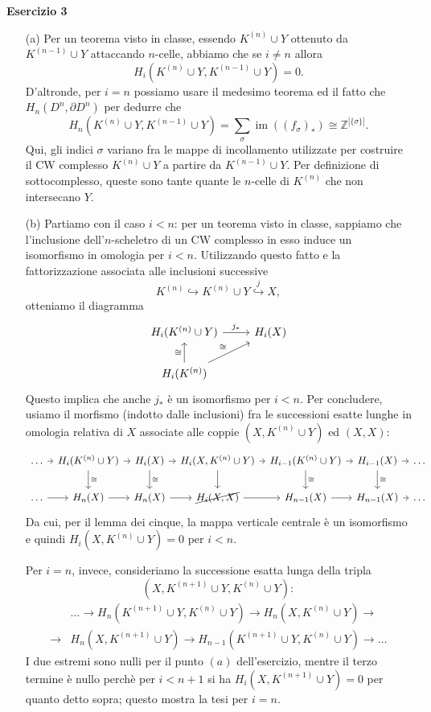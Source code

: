 \documentclass[a4paper]{article}
\newcommand{\Z}{\mathbb{Z}}
\newcommand{\im}{\operatorname{im}}
\theoremstyle{definition}
\theoremstyle{definition}
\theoremstyle{remark}
\theoremstyle{definition}
\begin{document}
\textbf{Esercizio 3}
\begin{itemize}
    \item[(a)] Per un teorema visto in classe, essendo $K^{(n)}\cup Y$ ottenuto da $K^{(n-1)}\cup Y$ attaccando $n$-celle,
abbiamo che se $i\neq n$ allora
\[
    H_i(K^{(n)}\cup Y, K^{(n-1)}\cup Y) = 0.
\]
D'altronde, per $i=n$ possiamo usare il medesimo teorema ed il fatto che $H_n(D^n,\partial D^n)$ per
dedurre che
\[
    H_n(K^{(n)}\cup Y, K^{(n-1)}\cup Y) = \sum_{\sigma} \im((f_\sigma)_*) \cong \Z^{|\{\sigma\}|}.
\]
Qui, gli indici $\sigma$ variano fra le mappe di incollamento utilizzate per costruire il CW complesso $K^{(n)}\cup Y$ a partire da $K^{(n-1)}\cup Y$. Per definizione di sottocomplesso, queste sono tante quante le $n$-celle di
$K^{(n)}$ che non intersecano $Y$.
\item[(b)] Partiamo con il caso $i<n$: per un teorema visto in classe, sappiamo che l'inclusione dell'$n$-scheletro di un CW complesso in esso induce un isomorfismo in
omologia per $i<n$. Utilizzando questo fatto e la fattorizzazione associata alle inclusioni successive \[
    K^{(n)}\hookrightarrow K^{(n)}\cup Y \overset{j}{\hookrightarrow} X
,\]
otteniamo il diagramma
\[
    \begin{tikzcd}
        H_i(K^{(n)}\cup Y) \arrow[r,"j_*"]  & H_i(X) \\
        H_i(K^{(n)}) \arrow[u, "\cong"] \arrow[ru, "\cong"]
    \end{tikzcd}
\]
Questo implica che anche $j_*$ è un isomorfismo per $i<n$. Per concludere, usiamo il morfismo (indotto dalle inclusioni) fra le successioni esatte lunghe in omologia relativa di $X$ associate alle coppie
$(X,K^{(n)}\cup Y)$ ed $(X,X)$:
\[
    \begin{tikzcd}[column sep=tiny]
        \dots \arrow[r] & H_i(K^{(n)}\cup Y) \arrow[d, "\cong"] \arrow[r] & H_i(X) \arrow[d, "\cong"] \arrow[r] & H_i(X,K^{(n)}\cup Y) \arrow[d] \arrow[r] & H_{i-1}(K^{(n)}\cup
        Y) \arrow[d, "\cong"] \arrow[r] & H_{i-1}(X) \arrow[d, "\cong"] \arrow[r] & \dots \\
        \dots \arrow[r] & H_n(X) \arrow[r] & H_n(X) \arrow[r] & \cancel{H_i(X,X)} \arrow[r] & H_{n-1}(X) \arrow[r] & H_{n-1}(X) \arrow[r] & \dots
    \end{tikzcd}
\]
Da cui, per il lemma dei cinque, la mappa verticale centrale è un isomorfismo e quindi $H_i(X,K^{(n)}\cup Y) = 0$ per $i<n$.

Per $i=n$, invece, consideriamo la successione esatta lunga della tripla \[(X,K^{(n+1)}\cup Y,K^{(n)}\cup Y):\]
    \begin{align*}
        & \dots \to  H_n(K^{(n+1)}\cup Y,K^{(n)}\cup Y) \to H_n(X,K^{(n)}\cup Y) \to  \\
         \to & H_n(X,K^{(n+1)}\cup Y)\to  H_{n-1}(K^{(n+1)}\cup Y,K^{(n)}\cup Y) \to  \dots
    \end{align*}
    I due estremi sono nulli per il punto $(a)$ dell'esercizio, mentre il terzo termine è nullo perchè per $i<n+1$ si ha $H_i(X,K^{(n+1)}\cup Y)=0$ per quanto detto sopra; questo
    mostra la tesi per $i=n$.


\end{itemize}
\end{document}
